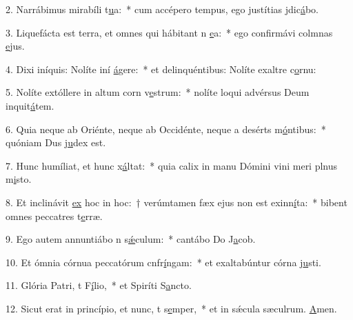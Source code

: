 2. Narrábimus mirabíli t\uline{u}a:~* cum accépero tempus, ego justítias jdic\uline{á}bo.\par 
3. Liquefácta est terra, et omnes qui hábitant n \uline{e}a:~* ego confirmávi colmnas \uline{e}jus.\par 
4. Dixi iníquis: Nolíte iní \uline{á}gere:~* et delinquéntibus: Nolíte exaltre c\uline{o}rnu:\par 
5. Nolíte extóllere in altum corn v\uline{e}strum:~* nolíte loqui advérsus Deum inquit\uline{á}tem.\par 
6. Quia neque ab Oriénte, neque ab Occidénte, neque a desérts m\uline{ó}ntibus:~* quóniam Dus j\uline{u}dex est.\par 
7. Hunc humíliat, et hunc x\uline{á}ltat:~* quia calix in manu Dómini vini meri plnus m\uline{i}sto.\par 
8. Et inclinávit \uline{ex} hoc in hoc:~† verúmtamen fæx ejus non est exinn\uline{í}ta:~* bibent omnes peccatres t\uline{e}rræ.\par 
9. Ego autem annuntiábo n s\uline{ǽ}culum:~* cantábo Do J\uline{a}cob.\par 
10. Et ómnia córnua peccatórum cnfr\uline{í}ngam:~* et exaltabúntur córna j\uline{u}sti.\par 
11. Glória Patri, t F\uline{í}lio,~* et Spiríti S\uline{a}ncto.\par 
12. Sicut erat in princípio, et nunc, t s\uline{e}mper,~* et in sǽcula sæculrum. \uline{A}men.\par 
